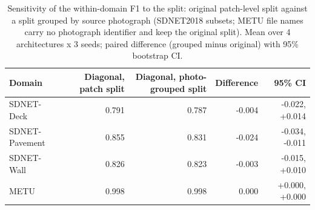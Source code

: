 \begin{table}[htbp]
\centering
\caption{Sensitivity of the within-domain F1 to the split: original patch-level split against a split grouped by source photograph (SDNET2018 subsets; METU file names carry no photograph identifier and keep the original split). Mean over 4 architectures x 3 seeds; paired difference (grouped minus original) with 95\% bootstrap CI.}
\label{tab:sensibilidad-particion}
\begin{tabular}{lrrrr}
\toprule
Domain & Diagonal, patch split & Diagonal, photo-grouped split & Difference & 95\% CI \\
\midrule
SDNET-Deck & 0.791 & 0.787 & -0.004 & -0.022, +0.014 \\
SDNET-Pavement & 0.855 & 0.831 & -0.024 & -0.034, -0.011 \\
SDNET-Wall & 0.826 & 0.823 & -0.003 & -0.015, +0.010 \\
METU & 0.998 & 0.998 & 0.000 & +0.000, +0.000 \\
\bottomrule
\end{tabular}
\end{table}
